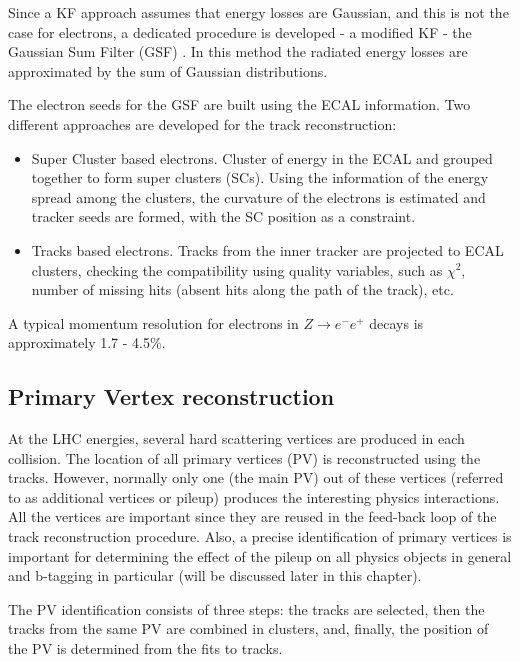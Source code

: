 \begin{small}
Since a KF approach assumes that energy losses are Gaussian, and this is not the case for electrons, a dedicated procedure is developed - a modified KF - the Gaussian Sum Filter (GSF) \cite{GSF}. In this method the radiated energy losses are approximated by the sum of Gaussian distributions. 

The electron seeds for the GSF are built using the ECAL information. Two different approaches are developed for the track reconstruction:

\begin{itemize}

\item Super Cluster based electrons. Cluster of energy in the ECAL and grouped together to form super clusters (SCs). Using the information of the energy spread among the clusters, the curvature of the electrons is estimated and tracker seeds are formed, with the SC position as a constraint. 
\item Tracks based electrons. Tracks from the inner tracker are projected to ECAL clusters, checking the compatibility using quality variables, such as $\chi^2$, number of missing hits (absent hits along the path of the track), etc. 
\end{itemize}

A typical momentum resolution for electrons in $Z \rightarrow e^- e^+$ decays is approximately 1.7 - 4.5$\%$.

\subsection{Primary Vertex reconstruction}\label{sec:PV_reconstruction}

At the LHC energies, several hard scattering vertices are produced in each collision. The location of all primary vertices (PV) is reconstructed using the tracks. However, normally only one (the main PV) out of these vertices (referred to as additional vertices or pileup) produces the interesting physics interactions. All the vertices are important since they are reused in the feed-back loop of the track reconstruction procedure. Also, a precise identification of primary vertices is important for determining the effect of the pileup on all physics objects in general and b-tagging in particular (will be discussed later in this chapter). 

The PV identification consists of three steps: the tracks are selected, then the tracks from the same PV are combined in clusters, and, finally, the position of the PV is determined from the fits to tracks. 


\end{small}
